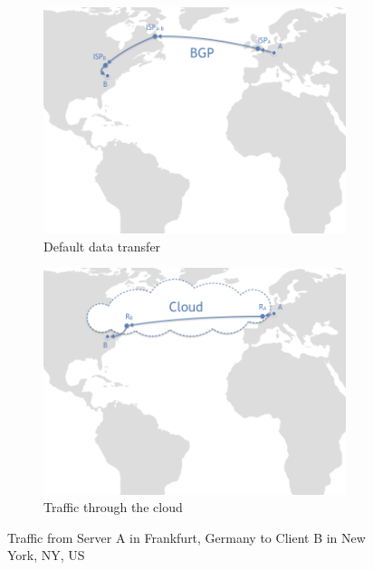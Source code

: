 \documentclass[10pt,sigconf]{acmart}
\begin{document}
\begin{figure}[t!]
  \centering
  \begin{subfigure}{.49\textwidth}
  \centering
    \includegraphics[width=0.97\textwidth,clip=true, trim = 0 10 0 0]{figures/overlay-vs-e2e002.png}
    \caption{Default data transfer}
    \label{fig:e2e-traffic}
\end{subfigure}
\begin{subfigure}{.49\textwidth}
  \centering
    \includegraphics[width=0.97\textwidth, clip, trim = 0 10 0 0]{figures/overlay-vs-e2e001.png}
    \caption{Traffic through the cloud}
    \label{fig:cloud-traffic}
\end{subfigure}
\caption{Traffic from Server A in Frankfurt, Germany to Client B in New York, NY, US
}
\label{fig:e2e-vs-cloud-traffic}
\end{figure}
\end{document}
